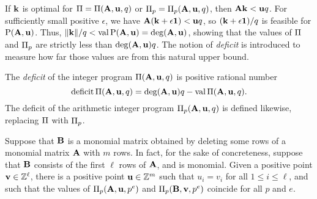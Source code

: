 \documentclass{article}
\begin{document}
If $\mathbf{k}$ is optimal for $\Pi = \Pi(\mathbf{A},\mathbf{u},q)$ or $\Pi_p = \Pi_p(\mathbf{A},\mathbf{u},q)$, then $\mathbf{A}\mathbf{k} < \mathbf{u}q$.
For sufficiently small positive $\epsilon$, we have $\mathbf{A}(\mathbf{k}+\epsilon\mathbf{1}) < \mathbf{u}q$, so $(\mathbf{k}+\epsilon \mathbf{1})/q$ is feasible for $\mathrm{P}(\mathbf{A},\mathbf{u})$.
Thus, $\| \mathbf{k} \|/q < \operatorname{val} \mathrm{P}(\mathbf{A},\mathbf{u}) = \operatorname{deg}(\mathbf{A},\mathbf{u})$, showing that the values of $\Pi$ and $\Pi_p$ are strictly less than $\operatorname{deg}(\mathbf{A},\mathbf{u})q$.
The notion of \emph{deficit} is introduced to measure how far those values are from this natural upper bound.

\begin{definition}
   The \emph{deficit} of the integer program $\Pi(\mathbf{A}, \mathbf{u}, q)$ is positive rational number
   \[ \operatorname{deficit} \Pi(\mathbf{A}, \mathbf{u}, q) = \operatorname{deg}(\mathbf{A},\mathbf{u})q - \operatorname{val} \Pi(\mathbf{A}, \mathbf{u}, q).\]
   The deficit of the arithmetic integer program $\Pi_p(\mathbf{A}, \mathbf{u}, q)$ is defined likewise, replacing $\Pi$ with $\Pi_p$.
\end{definition}

\begin{lemma} 
   \label{lifted-programs: L}
   Suppose that $\mathbf{B}$ is a monomial matrix obtained by deleting some rows of a monomial matrix $\mathbf{A}$ with $m$ rows.
   In fact, for the sake of concreteness, suppose that $\mathbf{B}$ consists of the first $\ell$ rows of $\mathbf{A}$, and is monomial.
   Given a positive point $\mathbf{v} \in \mathbb{Z}^{\ell}$, there is a positive point $\mathbf{u} \in \mathbb{Z}^{m}$ such that $u_i = v_i$ for all $1 \leq i \leq \ell$, and such that the values of $\Pi_p(\mathbf{A}, \mathbf{u}, p^e)$ and $\Pi_p(\mathbf{B}, \mathbf{v}, p^e)$ coincide for all $p$ and $e$.
\end{lemma}
\end{document}
